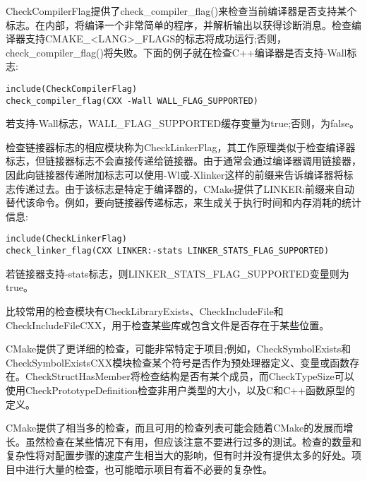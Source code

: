 CheckCompilerFlag提供了check\_compiler\_flag()来检查当前编译器是否支持某个标志。在内部，将编译一个非常简单的程序，并解析输出以获得诊断消息。检查编译器支持CMAKE\_<LANG>\_FLAGS的标志将成功运行;否则，check\_compiler\_flag()将失败。下面的例子就在检查C++编译器是否支持-Wall标志:

\begin{lstlisting}[style=styleCMake]
include(CheckCompilerFlag)
check_compiler_flag(CXX -Wall WALL_FLAG_SUPPORTED)
\end{lstlisting}

若支持-Wall标志，WALL\_FLAG\_SUPPORTED缓存变量为true;否则，为false。

检查链接器标志的相应模块称为CheckLinkerFlag，其工作原理类似于检查编译器标志，但链接器标志不会直接传递给链接器。由于通常会通过编译器调用链接器，因此向链接器传递附加标志可以使用-Wl或-Xlinker这样的前缀来告诉编译器将标志传递过去。由于该标志是特定于编译器的，CMake提供了LINKER:前缀来自动替代该命令。例如，要向链接器传递标志，来生成关于执行时间和内存消耗的统计信息:

\begin{lstlisting}[style=styleCMake]
include(CheckLinkerFlag)
check_linker_flag(CXX LINKER:-stats LINKER_STATS_FLAG_SUPPORTED)
\end{lstlisting}

若链接器支持-stats标志，则LINKER\_STATS\_FLAG\_SUPPORTED变量则为true。

比较常用的检查模块有CheckLibraryExists、CheckIncludeFile和CheckIncludeFileCXX，用于检查某些库或包含文件是否存在于某些位置。

CMake提供了更详细的检查，可能非常特定于项目;例如，CheckSymbolExists和CheckSymbolExistsCXX模块检查某个符号是否作为预处理器定义、变量或函数存在。CheckStructHasMember将检查结构是否有某个成员，而CheckTypeSize可以使用CheckPrototypeDefinition检查非用户类型的大小，以及C和C++函数原型的定义。

CMake提供了相当多的检查，而且可用的检查列表可能会随着CMake的发展而增长。虽然检查在某些情况下有用，但应该注意不要进行过多的测试。检查的数量和复杂性将对配置步骤的速度产生相当大的影响，但有时并没有提供太多的好处。项目中进行大量的检查，也可能暗示项目有着不必要的复杂性。
